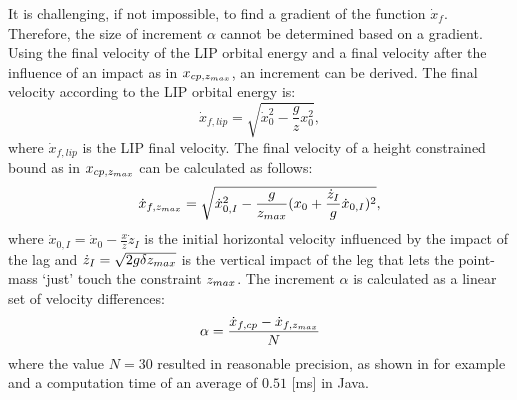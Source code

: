 It is challenging, if not impossible, to find a gradient of the function $\dot{x}_f$. Therefore, the size of increment $\alpha$ cannot be determined based on a gradient. Using the final velocity of the \ac{LIP} orbital energy and a final velocity after the influence of an impact as in $x_{cp,z_{max}}$, an increment can be derived. 
The final velocity according to the \ac{LIP} orbital energy is:
\begin{equation}
	\dot{x}_{f,lip} = \sqrt{\dot{x}_0^2-\frac{g}{z}x_0^2},
\end{equation}
where $\dot{x}_{f,lip}$ is the \ac{LIP} final velocity. The final velocity of a height constrained bound as in $x_{cp,z_{max}}$ can be calculated as follows:
\begin{equation}
	\dot{x}_{f,z_{max}} = \sqrt{\dot{x}_{0,I}^2-\frac{g}{z_{max}}(x_0+\frac{\dot{z}_I}{g}\dot{x}_{0,I})^2},
\end{equation}
where $\dot{x}_{0,I}=\dot{x}_0 - \frac{x}{z}\dot{z}_I$ is the initial horizontal velocity influenced by the impact of the lag and $\dot{z}_I = \sqrt{2g\delta z_{max}}$ is the vertical impact of the leg that lets the point-mass `just' touch the constraint $z_{max}$. The increment $\alpha$ is calculated as a linear set of velocity differences:
\begin{equation}
	\alpha =\frac{\dot{x}_{f,cp} -\dot{x}_{f,z_{max}}}{N}
\end{equation}
where the value $N=30$ resulted in reasonable precision, as shown in for example  and a computation time of an average of $0.51$ [ms] in Java.

